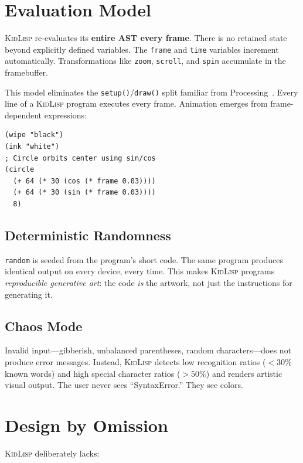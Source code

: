 \documentclass[10pt,letterpaper,twocolumn]{article}
\newcommand{\kl}{\textsc{KidLisp}}
\begin{document}
\section{Evaluation Model}

\kl{} re-evaluates its \textbf{entire AST every frame}. There is no retained state beyond explicitly defined variables. The \texttt{frame} and \texttt{time} variables increment automatically. Transformations like \texttt{zoom}, \texttt{scroll}, and \texttt{spin} accumulate in the framebuffer.

This model eliminates the \texttt{setup()}/\texttt{draw()} split familiar from Processing~\citep{reas2007processing}. Every line of a \kl{} program executes every frame. Animation emerges from frame-dependent expressions:

\begin{lstlisting}
(wipe "black")
(ink "white")
; Circle orbits center using sin/cos
(circle
  (+ 64 (* 30 (cos (* frame 0.03))))
  (+ 64 (* 30 (sin (* frame 0.03))))
  8)
\end{lstlisting}

\subsection{Deterministic Randomness}

\texttt{random} is seeded from the program's short code. The same program produces identical output on every device, every time. This makes \kl{} programs \emph{reproducible generative art}: the code \emph{is} the artwork, not just the instructions for generating it.

\subsection{Chaos Mode}

Invalid input---gibberish, unbalanced parentheses, random characters---does not produce error messages. Instead, \kl{} detects low recognition ratios ($<30\%$ known words) and high special character ratios ($>50\%$) and renders artistic visual output. The user never sees ``SyntaxError.'' They see colors.

\section{Design by Omission}

\kl{} deliberately lacks:
\end{document}
